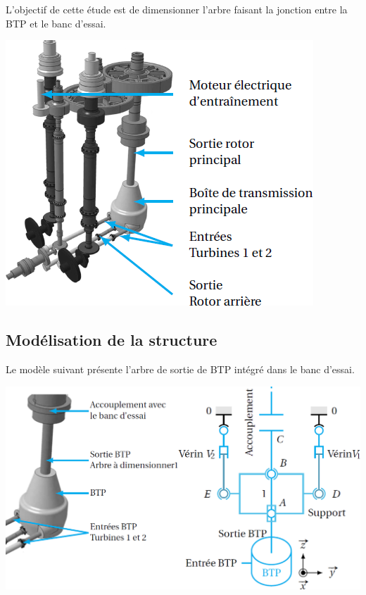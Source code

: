 \documentclass[10pt,fleqn]{article} %
\begin{document}
\begin{multicols}{2}
\begin{obj}
L’objectif de cette étude est de dimensionner l’arbre faisant la jonction entre la
BTP et le banc d’essai.
\end{obj}

\begin{center}
\includegraphics[width=.8\linewidth]{images/fig_03}
\end{center}






\subsection*{Modélisation de la structure}


Le modèle suivant présente l'arbre de sortie de BTP intégré dans le banc d'essai.

\begin{center}
\includegraphics[width=\linewidth]{images/fig_04}
\end{center}


\end{multicols}
\end{document}
